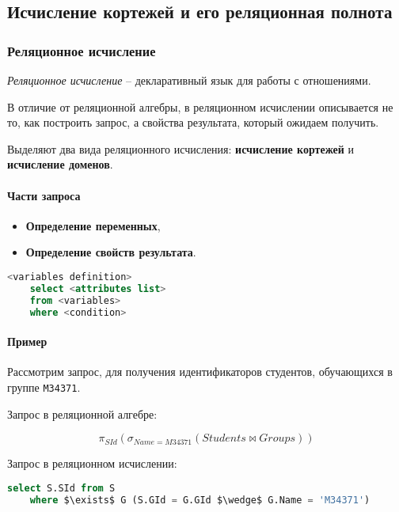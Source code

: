 \subsection{Исчисление кортежей и его реляционная полнота}

\subsubsection{Реляционное исчисление}

\begin{definition}
	\textit{Реляционное исчисление} -- декларативный язык для работы с отношениями.
\end{definition}

В отличие от реляционной алгебры, в реляционном исчислении описывается не то, как построить запрос,
а свойства результата, который ожидаем получить.

Выделяют два вида реляционного исчисления: \textbf{исчисление кортежей} и \textbf{исчисление доменов}.

\paragraph{Части запроса}

\begin{itemize}
	\item \textbf{Определение переменных},
	\item \textbf{Определение свойств результата}.
\end{itemize}

\begin{lstlisting}[language=SQL]
    <variables definition>
    select <attributes list>
    from <variables>
    where <condition>
\end{lstlisting}

\paragraph{Пример}

Рассмотрим запрос, для получения идентификаторов студентов, обучающихся в группе
\texttt{M34371}.

Запрос в реляционной алгебре:

\[
	\pi_{SId}(\sigma_{Name = M34371} (Students \bowtie Groups))
\]

Запрос в реляционном исчислении:

\begin{lstlisting}[language=SQL, mathescape=true]
    select S.SId from S
    where $\exists$ G (S.GId = G.GId $\wedge$ G.Name = 'M34371')
\end{lstlisting}

